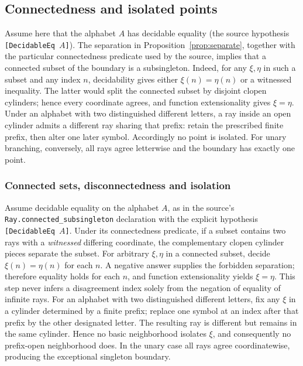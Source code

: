 \documentclass[11pt,reqno]{amsart}
\theoremstyle{definition}\newtheorem{definition}[theorem]{Definition}
\theoremstyle{remark}\newtheorem{remark}[theorem]{Remark}
\begin{document}
\subsection{Connectedness and isolated points}\label{main:sub-34}
Assume here that the alphabet $A$ has decidable equality (the source hypothesis \texttt{[DecidableEq $A$]}). The separation in Proposition~\ref{prop:separate}, together with the particular connectedness predicate used by the source, implies that a connected subset of the boundary is a subsingleton. Indeed, for any $\xi,\eta$ in such a subset and any index $n$, decidability gives either $\xi(n)=\eta(n)$ or a witnessed inequality. The latter would split the connected subset by disjoint clopen cylinders; hence every coordinate agrees, and function extensionality gives $\xi=\eta$. Under an alphabet with two distinguished different letters, a ray inside an open cylinder admits a different ray sharing that prefix: retain the prescribed finite prefix, then alter one later symbol. Accordingly no point is isolated. For unary branching, conversely, all rays agree letterwise and the boundary has exactly one point.


\medskip
\subsubsection*{Connected sets, disconnectedness and isolation}\label{supp:10-5}
Assume decidable equality on the alphabet $A$, as in the source's \texttt{Ray.}\allowbreak\texttt{connected\_}\allowbreak\texttt{subsingleton} declaration with the explicit hypothesis \texttt{[DecidableEq $A$]}. Under its connectedness predicate, if a subset contains two rays with a \emph{witnessed} differing coordinate, the complementary clopen cylinder pieces separate the subset. For arbitrary $\xi,\eta$ in a connected subset, decide $\xi(n)=\eta(n)$ for each $n$. A negative answer supplies the forbidden separation; therefore equality holds for each $n$, and function extensionality yields $\xi=\eta$. This step never infers a disagreement index solely from the negation of equality of infinite rays. For an alphabet with two distinguished different letters, fix any $\xi$ in a cylinder determined by a finite prefix; replace one symbol at an index after that prefix by the other designated letter. The resulting ray is different but remains in the same cylinder. Hence no basic neighborhood isolates $\xi$, and consequently no prefix-open neighborhood does. In the unary case all rays agree coordinatewise, producing the exceptional singleton boundary.
\medskip
\end{document}
